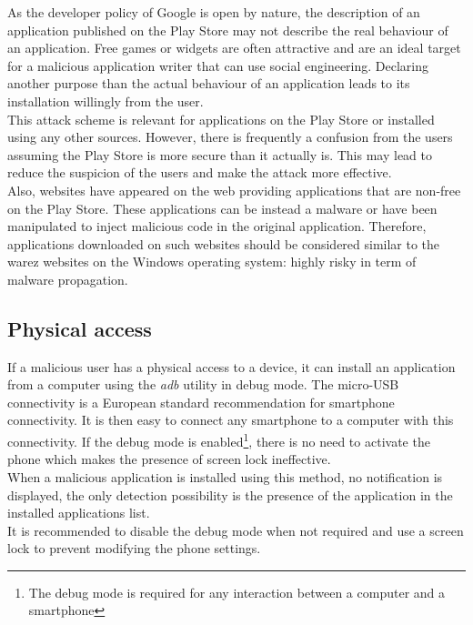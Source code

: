 As the developer policy of Google is open by nature, the description of an application published on the Play Store may not describe the real behaviour of an application.
Free games or widgets are often attractive and are an ideal target for a malicious application writer that can use social engineering.
Declaring another purpose than the actual behaviour of an application leads to its installation willingly from the user.\\

This attack scheme is relevant for applications on the Play Store or installed using any other sources.
However, there is frequently a confusion from the users assuming the Play Store is more secure than it actually is.
This may lead to reduce the suspicion of the users and make the attack more effective.\\

Also, websites have appeared on the web providing applications that are non-free on the Play Store.
These applications can be instead a malware or have been manipulated to inject malicious code in the original application.
Therefore, applications downloaded on such websites should be considered similar to the warez websites on the Windows operating system: highly risky in term of malware propagation.

\subsection{Physical access}

If a malicious user has a physical access to a device, it can install an application from a computer using the \emph{adb} utility in debug mode.
The micro-USB connectivity is a European standard recommendation for smartphone connectivity.
It is then easy to connect any smartphone to a computer with this connectivity.
If the debug mode is enabled\footnote{The debug mode is required for any interaction between a computer and a smartphone}, there is no need to activate the phone which makes the presence of screen lock ineffective.\\

When a malicious application is installed using this method, no notification is displayed, the only detection possibility is the presence of the application in the installed applications list.\\

It is recommended to disable the debug mode when not required and use a screen lock to prevent modifying the phone settings.

